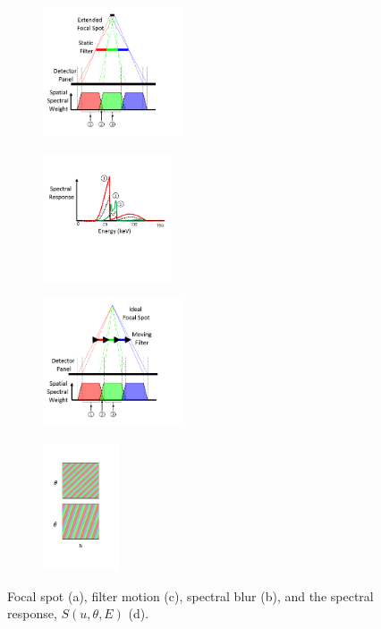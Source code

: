 \documentclass[]{spie}  %
\begin{document}
\begin{figure}[b!]
\begin{subfigure}[t]{.28\textwidth}
  \centering
  \includegraphics[trim = {0 8.5mm 30mm 6mm},clip,align=c,height=38mm, keepaspectratio]{figures/focal_spot_blur}
  \caption{}
  \label{fig:focalSpotBlur}
\end{subfigure}%
\begin{subfigure}[t]{.28\textwidth}
  \centering
  \includegraphics[trim = {0mm 0mm 0 0mm},clip,align=c,height=38mm, keepaspectratio]{figures/spectra}
  \caption{}
  \label{fig:spectra}
\end{subfigure}%
\begin{subfigure}[t]{.28\textwidth}
  \centering
  \includegraphics[trim = {0 9mm 30mm 6mm},clip,align=c,height=38mm, keepaspectratio]{figures/filter_motion_blur}
  \caption{}
  \label{fig:filterMotionBlur}
\end{subfigure}
\begin{subfigure}[t]{.15\textwidth}
  \centering
  \includegraphics[trim = {10mm 9mm 10mm 0},clip,align=c,height=38mm, keepaspectratio]{figures/sampling_figure}
  \caption{}
  \label{fig:spectralSampling}
\end{subfigure}
\caption{Focal spot (a), filter motion (c), spectral blur (b), and the spectral response, $S(u,\theta,E)$ (d).}
\label{fig:spectralBlur}
\end{figure}
\end{document}
